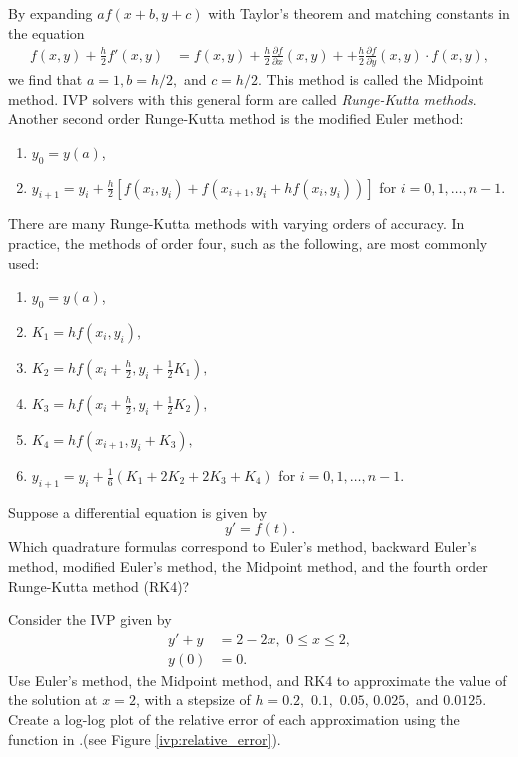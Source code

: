 By expanding $a f(x+b, y+c)$ with Taylor's theorem and matching constants in the equation
\begin{align*}
f(x,y) + \frac{h}{2}f'(x,y) &= f(x,y) + \frac{h}{2}\frac{\partial f}{\partial x}(x,y) +  + \frac{h}{2}\frac{\partial f}{\partial y}(x,y) \cdot f(x,y),
\end{align*}
we find that $a = 1, b = h/2,$ and $c = h/2$. This method is called the Midpoint method. IVP solvers with this general form are called \textit{Runge-Kutta methods}. Another second order Runge-Kutta method is the modified Euler method: 

\begin{enumerate}
\item $y_0 = y(a)$,
\item $y_{i+1} = y_i + \frac{h}{2}[ f(x_i, y_i) + f(x_{i+1}, y_i+ hf(x_i, y_i))]$ for $i = 0,1,\hdots, n-1.$
\end{enumerate}


There are many Runge-Kutta methods with varying orders of accuracy. In practice, the methods of order four, such as the following, are most commonly used: 
\begin{enumerate}
\item $y_0 = y(a)$, 
\item $K_1 = hf(x_i,y_i),$
\item $K_2 = hf(x_i + \frac{h}{2}, y_i + \frac{1}{2} K_1),$
\item $K_3 = hf(x_i + \frac{h}{2} , y_i + \frac{1}{2} K_2),$
\item $K_4 = hf(x_{i+1} , y_i +  K_3),$
\item $y_{i+1} = y_i + \frac{1}{6}(K_1 + 2K_2 + 2K_3 + K_4)$ for $i = 0,1,\hdots,n-1.$
\end{enumerate}


\begin{problem}
Suppose a differential equation is given by
\[ y' = f(t).\]
Which quadrature formulas correspond to Euler's method, backward Euler's method, modified Euler's method, the Midpoint method, and the fourth order Runge-Kutta method (RK4)? 
\end{problem}



\begin{problem} Consider the IVP given by 
\begin{align*}
y' + y &= 2-2x,\,\, 0 \leq x \leq 2, \\
y(0) &= 0.
\end{align*}
Use Euler's method, the Midpoint method, and RK4 to approximate the value of the solution at $x = 2$, with a stepsize of $h = 0.2,$ $ 0.1,$ $0.05 $, $0.025,$ and $0.0125.$ Create a log-log plot of the relative error of each approximation using the  function in .(see Figure \ref{ivp:relative_error}).
\end{problem}


